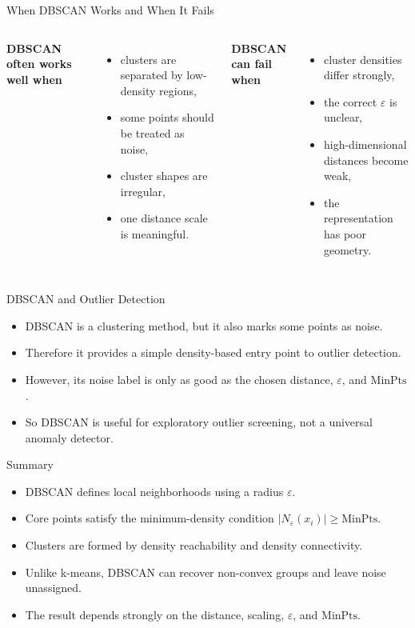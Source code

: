 \begin{frame}{When DBSCAN Works and When It Fails}
\begin{columns}[T]
\textbf{DBSCAN often works well when}
\begin{itemize}
  \item clusters are separated by low-density regions,
  \pause
  \item some points should be treated as noise,
  \pause
  \item cluster shapes are irregular,
  \pause
  \item one distance scale is meaningful.
\end{itemize}

\pause
{}
\textbf{DBSCAN can fail when}
\begin{itemize}
  \item cluster densities differ strongly,
  \pause
  \item the correct $\varepsilon$ is unclear,
  \pause
  \item high-dimensional distances become weak,
  \pause
  \item the representation has poor geometry.
\end{itemize}
\end{columns}
\end{frame}

\begin{frame}{DBSCAN and Outlier Detection}
\begin{itemize}
  \item DBSCAN is a clustering method, but it also marks some points as noise.
  \pause
  \item Therefore it provides a simple density-based entry point to outlier detection.
  \pause
  \item However, its noise label is only as good as the chosen distance, $\varepsilon$, and $\text{MinPts}$.
  \pause
  \item So DBSCAN is useful for exploratory outlier screening, not a universal anomaly detector.
\end{itemize}
\end{frame}

\begin{frame}{Summary}
\begin{itemize}
  \item DBSCAN defines local neighborhoods using a radius $\varepsilon$.
  \item Core points satisfy the minimum-density condition $|N_\varepsilon(x_i)| \ge \text{MinPts}$.
  \item Clusters are formed by density reachability and density connectivity.
  \item Unlike k-means, DBSCAN can recover non-convex groups and leave noise unassigned.
  \item The result depends strongly on the distance, scaling, $\varepsilon$, and $\text{MinPts}$.
\end{itemize}
\end{frame}

